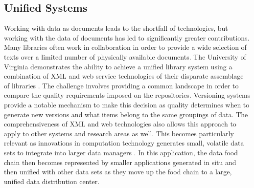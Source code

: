 \subsection{Unified Systems}

Working with data as documents leads to the shortfall of technologies, but working with the data of documents has led to significantly greater contributions.
Many libraries often work in collaboration in order to provide a wide selection of texts over a limited number of physically available documents.
The University of Virginia demonstrates the ability to achieve a unified library system using a combination of XML and web service technologies of their disparate assemblage of libraries \cite{Payette2002}.
The challenge involves providing a common landscape in order to compare the quality requirements imposed on the repositories.
Versioning systems provide a notable mechanism to make this decision as quality determines when to generate new versions and what items belong to the same groupings of data.
The comprehensiveness of XML and web technologies also allows this approach to apply to other systems and research areas as well.
This becomes particularly relevant as innovations in computation technology generates small, volatile data sets to integrate into larger data managers \cite{Baker2009}.
In this application, the data food chain then becomes represented by smaller applications generated in situ and then unified with other data sets as they move up the food chain to a large, unified data distribution center.

